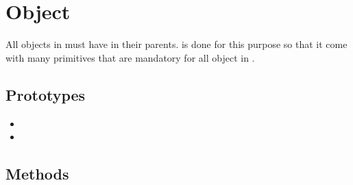 \section{Object}

All objects in \us must have  in their
parents.  is done for this purpose so that it come
with many primitives that are mandatory for all object in \us.

\subsection{Prototypes}

\begin{itemize}
\item {}
\item {}
\end{itemize}

\subsection{Methods}

